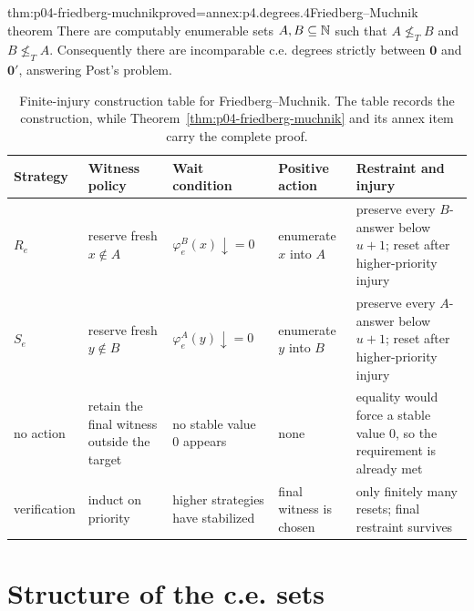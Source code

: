 \begin{hbtheorem}{thm:p04-friedberg-muchnik}{proved=annex:p4.degrees.4}{Friedberg--Muchnik theorem}
There are computably enumerable sets \(A,B\subseteq\mathbb{N}\) such that
\(A\not\leq_TB\) and \(B\not\leq_TA\).  Consequently there are incomparable
c.e. degrees strictly between \(\mathbf0\) and \(\mathbf0'\), answering
Post's problem.
\end{hbtheorem}

\begin{table}[htbp]
\centering
\small
\begin{tabular}{@{}p{.65in}p{1.15in}p{1.25in}p{1.25in}p{1.30in}@{}}
\toprule
Strategy & Witness policy & Wait condition & Positive action & Restraint and injury \\
\midrule
\(R_e\) & reserve fresh \(x\notin A\) & \(\varphi_e^B(x)\downarrow=0\) & enumerate \(x\) into \(A\) & preserve every \(B\)-answer below \(u+1\); reset after higher-priority injury \\
\(S_e\) & reserve fresh \(y\notin B\) & \(\varphi_e^A(y)\downarrow=0\) & enumerate \(y\) into \(B\) & preserve every \(A\)-answer below \(u+1\); reset after higher-priority injury \\
no action & retain the final witness outside the target & no stable value \(0\) appears & none & equality would force a stable value \(0\), so the requirement is already met \\
verification & induct on priority & higher strategies have stabilized & final witness is chosen & only finitely many resets; final restraint survives \\
\bottomrule
\end{tabular}
\caption{Finite-injury construction table for Friedberg--Muchnik.  The table
records the construction, while
Theorem~\ref{thm:p04-friedberg-muchnik} and its annex item carry the complete
proof.}
\label{tab:p04-finite-injury}
\end{table}

\section{Structure of the c.e. sets}
\label{sec:p04-ce-structure}


